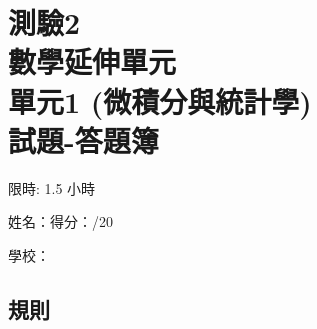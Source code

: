 \documentclass[12pt]{article}
\begin{document}
    \thispagestyle{empty}

    \centering 

    \section*{測驗2\\數學延伸單元\\單元1 (微積分與統計學)\\試題-答題簿}

    限時: 1.5 小時

    姓名：\hrulefill \hfill 得分：\hrulefill/20

    學校：\hrulefill

    \raggedright

    \subsection*{規則}
\end{document}
